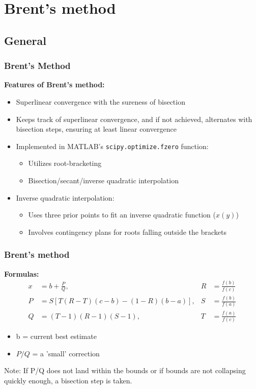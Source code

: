 \section{Brent's method}
\subsection*{General}
\begin{frame}[fragile]
  \frametitle{Brent's Method}

  \textbf{Features of Brent's method:}
  \begin{itemize}
    \item Superlinear convergence with the sureness of bisection
    \item Keeps track of superlinear convergence, and if not achieved, alternates with bisection steps, ensuring at least linear convergence
    \item Implemented in MATLAB's \texttt{scipy.optimize.fzero} function:
          \begin{itemize}
            \item Utilizes root-bracketing
            \item Bisection/secant/inverse quadratic interpolation
          \end{itemize}
    \item Inverse quadratic interpolation:
          \begin{itemize}
            \item Uses three prior points to fit an inverse quadratic function ($x(y)$)
            \item Involves contingency plans for roots falling outside the brackets
          \end{itemize}
  \end{itemize}

\end{frame}

\begin{frame}[fragile]
  \frametitle{Brent's method}
  \textbf{Formulas:}
  \begin{align*}
    x & = b + \frac{P}{Q},                        & R & = \frac{f(b)}{f(c)} \\
    P & = S\left[T(R-T)(c-b) - (1-R)(b-a)\right], & S & = \frac{f(b)}{f(a)} \\
    Q & = (T-1)(R-1)(S-1),                        & T & = \frac{f(a)}{f(c)}
  \end{align*}
  \begin{itemize}
    \item b = current best estimate
    \item $P/Q$ = a 'small' correction
  \end{itemize}
  Note: If P/Q does not land within the bounds or if bounds are not collapsing quickly enough, a bisection step is taken.
\end{frame}

